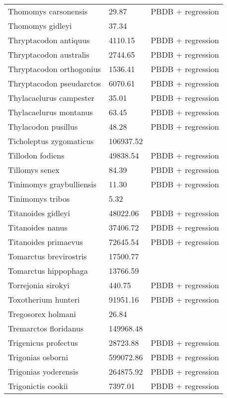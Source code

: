 \documentclass{article}
\begin{document}
\begin{center}
\begin{longtable}{p{} p{} p{} }
  Thomomys carsonensis & 29.87 & PBDB + regression \\ 
  Thomomys gidleyi & 37.34 & \cite{Tomiya2013} \\ 
  Thryptacodon antiquus & 4110.15 & PBDB + regression \\ 
  Thryptacodon australis & 2744.65 & PBDB + regression \\ 
  Thryptacodon orthogonius & 1536.41 & PBDB + regression \\ 
  Thryptacodon pseudarctos & 6070.61 & PBDB + regression \\ 
  Thylacaelurus campester & 35.01 & PBDB + regression \\ 
  Thylacaelurus montanus & 63.45 & PBDB + regression \\ 
  Thylacodon pusillus & 48.28 & PBDB + regression \\ 
  Ticholeptus zygomaticus & 106937.52 & \cite{Tomiya2013} \\ 
  Tillodon fodiens & 49838.54 & PBDB + regression \\ 
  Tillomys senex & 84.39 & PBDB + regression \\ 
  Tinimomys graybulliensis & 11.30 & PBDB + regression \\ 
  Tinimomys tribos & 5.32 & \cite{Skinner1972} \\ 
  Titanoides gidleyi & 48022.06 & PBDB + regression \\ 
  Titanoides nanus & 37406.72 & PBDB + regression \\ 
  Titanoides primaevus & 72645.54 & PBDB + regression \\ 
  Tomarctus brevirostris & 17500.77 & \cite{Tomiya2013} \\ 
  Tomarctus hippophaga & 13766.59 & \cite{Tomiya2013} \\ 
  Torrejonia sirokyi & 440.75 & PBDB + regression \\ 
  Toxotherium hunteri & 91951.16 & PBDB + regression \\ 
  Tregosorex holmani & 26.84 & \cite{Tomiya2013} \\ 
  Tremarctos floridanus & 149968.48 & \cite{Smith2004} \\ 
  Trigenicus profectus & 28723.88 & PBDB + regression \\ 
  Trigonias osborni & 599072.86 & PBDB + regression \\ 
  Trigonias yoderensis & 264875.92 & PBDB + regression \\ 
  Trigonictis cookii & 7397.01 & PBDB + regression \\ 

\end{longtable}
\end{center}
\end{document}
